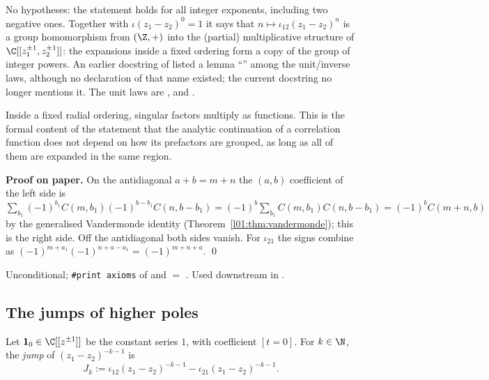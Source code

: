 \begin{dictionary}
No hypotheses: the statement holds for all integer exponents, including two negative ones. Together with
$\iota(z_1-z_2)^0 = 1$ it says that $n\mapsto\iota_{12}(z_1-z_2)^n$ is a group homomorphism from $(\Z,+)$ into the
(partial) multiplicative structure of $\C[[z_1^{\pm1},z_2^{\pm1}]]$: the expansions inside a fixed ordering form a
copy of the group of integer powers. An earlier docstring of  listed a lemma
``'' among the unit/inverse laws, although no declaration of that name existed; the
current docstring no longer mentions it. The unit laws are , 
and .
\end{dictionary}

\begin{physics}
Inside a fixed radial ordering, singular factors multiply as functions. This is the formal content of the
statement that the analytic continuation of a correlation function does not depend on how its prefactors are
grouped, as long as all of them are expanded in the same region.
\end{physics}

\textbf{Proof on paper.} On the antidiagonal $a+b = m+n$ the $(a,b)$ coefficient of the left side is
$\sum_{b_1}(-1)^{b_1}C(m,b_1)(-1)^{b-b_1}C(n,b-b_1) = (-1)^b\sum_{b_1}C(m,b_1)C(n,b-b_1) = (-1)^bC(m+n,b)$ by the
generalised Vandermonde identity (Theorem~\ref{l01:thm:vandermonde}); this is the right side. Off the
antidiagonal both sides vanish. For $\iota_{21}$ the signs combine as
$(-1)^{m+a_1}(-1)^{n+a-a_1} = (-1)^{m+n+a}$. \qed

\begin{status}
Unconditional; \texttt{\#print axioms} of  and  $=$
. Used downstream in
.
\end{status}

\subsection{The jumps of higher poles}

\begin{definition}\label{l01:def:negpowjump}
Let $\mathbf 1_0\in\C[[z^{\pm1}]]$ be the constant series $1$, with coefficient $[t = 0]$. For $k\in\N$, the
\emph{jump} of $(z_1-z_2)^{-k-1}$ is
\begin{equation*}
  J_k := \iota_{12}(z_1-z_2)^{-k-1}-\iota_{21}(z_1-z_2)^{-k-1}.
\end{equation*}
\end{definition}


